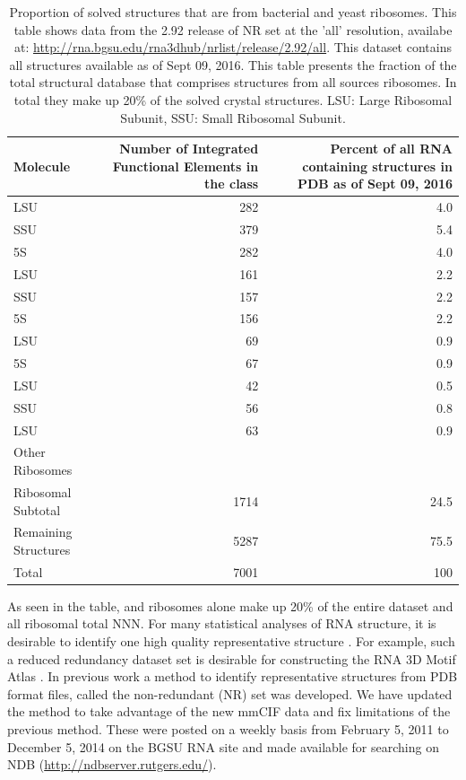 \begin{table}
  \begin{tabulary}{\linewidth}{LRR}
    \toprule
    Molecule &
      Number of Integrated Functional Elements in the class &
      Percent of all RNA containing structures in PDB as of Sept 09, 2016 \\
    \midrule
    \TT{} LSU            & 282  & 4.0  \\
    \TT{} SSU            & 379  & 5.4  \\
    \TT{} 5S             & 282  & 4.0  \\
    \EC{} LSU            & 161  & 2.2  \\
    \EC{} SSU            & 157  & 2.2  \\
    \EC{} 5S             & 156  & 2.2  \\
    \HM{} LSU            & 69   & 0.9  \\
    \HM{} 5S             & 67   & 0.9  \\
    \DR{} LSU            & 42   & 0.5  \\
    \SC{} SSU            & 56   & 0.8  \\
    \SC{} LSU            & 63   & 0.9  \\
    Other Ribosomes      &      &      \\
    Ribosomal Subtotal   & 1714 & 24.5 \\
    Remaining Structures & 5287 & 75.5 \\
    Total                & 7001 & 100  \\
    \bottomrule
  \end{tabulary}
  \caption{Proportion of solved structures that are from bacterial and yeast
    ribosomes. This table shows data from the 2.92 release of NR set at the
    'all' resolution, availabe at:
    \url{http://rna.bgsu.edu/rna3dhub/nrlist/release/2.92/all}. This dataset contains
    all structures available as of Sept 09, 2016. This table presents the
    fraction of the total structural database that comprises structures from all
    sources ribosomes. In total they make up 20\% of the solved crystal
  structures. LSU: Large Ribosomal Subunit, SSU: Small Ribosomal Subunit.}
  \label{tab:mol-dist}
\end{table}

As seen in the table, \EC{} and \TT{} ribosomes alone make up 20\% of
the entire dataset and all ribosomal total NNN. For many statistical analyses of
RNA structure, it is desirable to identify one high quality representative
structure \cite{Leontis2012b}. For example, such a reduced redundancy dataset
set is desirable for constructing the RNA 3D Motif Atlas \cite{Petrov2013}. In
previous work a method to identify representative structures  from PDB format
files, called the non-redundant (NR) set was developed. We have updated the
method to take advantage of the new mmCIF data and fix limitations of the
previous method. These were posted on a weekly basis from February 5, 2011 to
December 5, 2014 on the BGSU RNA site and made available for searching on NDB
(\url{http://ndbserver.rutgers.edu/}).

